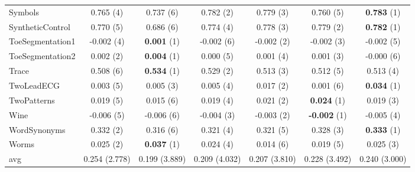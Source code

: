 \begin{table}[ht]
\begin{adjustbox}{width=\textwidth}
\begin{tabular}{lcccccc}
    Symbols & 0.765 (4) & 0.737 (6) & 0.782 (2) & 0.779 (3) & 0.760 (5) & \textbf{0.783} (1) \\
    SyntheticControl & 0.770 (5) & 0.686 (6) & 0.774 (4) & 0.778 (3) & 0.779 (2) & \textbf{0.782} (1) \\
    ToeSegmentation1 & -0.002 (4) & \textbf{0.001} (1) & -0.002 (6) & -0.002 (2) & -0.002 (3) & -0.002 (5) \\
    ToeSegmentation2 & 0.002 (2) & \textbf{0.004} (1) & 0.000 (5) & 0.001 (4) & 0.001 (3) & -0.000 (6) \\
    Trace & 0.508 (6) & \textbf{0.534} (1) & 0.529 (2) & 0.513 (3) & 0.512 (5) & 0.513 (4) \\
    TwoLeadECG & 0.003 (5) & 0.005 (3) & 0.005 (4) & 0.017 (2) & 0.001 (6) & \textbf{0.034} (1) \\
    TwoPatterns & 0.019 (5) & 0.015 (6) & 0.019 (4) & 0.021 (2) & \textbf{0.024} (1) & 0.019 (3) \\
    Wine & -0.006 (5) & -0.006 (6) & -0.004 (3) & -0.003 (2) & \textbf{-0.002} (1) & -0.005 (4) \\
    WordSynonyms & 0.332 (2) & 0.316 (6) & 0.321 (4) & 0.321 (5) & 0.328 (3) & \textbf{0.333} (1) \\
    Worms & 0.025 (2) & \textbf{0.037} (1) & 0.024 (4) & 0.014 (6) & 0.019 (5) & 0.025 (3) \\
    \hline 
    avg & 0.254 (2.778) & 0.199 (3.889) & 0.209 (4.032) & 0.207 (3.810) & 0.228 (3.492) & 0.240 (3.000) \\ 
    \hline
    \end{tabular}
    \end{adjustbox}
    \end{table}
    
    
    
